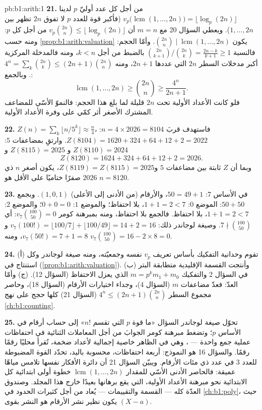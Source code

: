 \begin{solution}{pb:b1:arith:1}
\textbf{21.} من أجل كل عدد أوليّ $p$ لدينا $v_p\bigl(\operatorname{lcm}(1,
\dots, 2n)\bigr) = \lfloor\log_p(2n)\rfloor$ (فأكبر قوة للعدد
$p$ لا تفوق $2n$ تظهر بين $1, \dots, 2n$). ويعطي السؤال 20
مع $m = n$ أن $v_p\binom{2n}n \leq \lfloor\log_p(2n)\rfloor$
من أجل كل $p$: ومنه حسب \cref{prop:b1:arith:valuation} يكون $\binom{2n}n
\mid \operatorname{lcm}(1, \dots, 2n)$. وأمّا الحجم: فالنسبة
$\binom{2n}{k+1}/\binom{2n}k = \frac{2n-k}{k+1} \geq 1$ بالضبط
من أجل $k < n$، ومنه فالمدخلة المركزية أكبر مدخلات
السطر $2n$ التي عددها $2n + 1$، ومنه $4^n = \sum_k \binom{2n}k \leq
(2n+1)\binom{2n}n$. وبالجمع:
\[
\operatorname{lcm}(1, \dots, 2n) \geq \binom{2n}n \geq
\frac{4^n}{2n + 1} .
\]
فلو كانت الأعداد الأولية تحت $2n$ قليلة لما بلغ  هذا
الحجم: فالنموّ الأسّي للمضاعف المشترك الأصغر أثر كمّي على
وفرة الأعداد الأولية.

\textbf{22.} $Z(n) = \sum_k\lfloor n/5^k\rfloor \approx \frac
n4$، فاستهدف قربَ $n = 4 \times 2026 = 8104$: $Z(8104) = 1620 +
324 + 64 + 12 + 2 = 2022$. وارتقِ بمضاعفات $5$: $Z(8110)
= 2024$ و $Z(8115) = 2025$ و
\[
Z(8120) = 1624 + 324 + 64 + 12 + 2 = 2026 .
\]
وبما أن $Z$ ثابتة بين مضاعفات $5$ و$Z(8119) =
Z(8115) = 2025$، يكون أصغر $n$ ذي $2026$ صفرًا ختاميًا على
الأقل هو $n = 8120$.

\textbf{23.} في الأساس $7$: $50 = 49 + 1$، والأرقام (من الأدنى إلى الأعلى) $(1, 0,
1)$. وبجمع $50 + 50$: الموضع $0$: $1 + 1 = 2 < 7$، بلا احتفاظ؛
والموضع $1$: $0 + 0 = 0$؛ والموضع $2$: $1 + 1 = 2 < 7$، بلا
احتفاظ. فالجمع بلا احتفاظ، ومنه بمبرهنة كومر $v_7\binom{100}{50} = 0$: أي $7 \nmid
\binom{100}{50}$. وصيغة لوجاندر  ذلك: $v_7(100!) = \lfloor 100/7
\rfloor + \lfloor 100/49 \rfloor = 14 + 2 = 16$ و$v_7(50!) = 7
+ 1 = 8$، ومنه $v_7\binom{100}{50} = 16 - 2\times8 = 0$.

\textbf{24.} (أ) تقوم وحدانية التفكيك بأساس تعريف
$v_p$ نفسه وجمعيّته، ومنه صيغة لوجاندر
وكل استنتاج في 
(\cref{prop:b1:arith:valuation}). (ب) وأنتجت القسمة الإقليدية
متطابقة البتر في السؤال 2 والتفكيك $m = p^km_1 +
m_0$ الذي يعزل الاحتفاظ (السؤال 12). (ج) وأمّا العدّ: فعدّ
مضاعفات $m$ (السؤال 4)، وجداء اختيارات الأرقام
(السؤال 18)، وحاصر مجموع السطر $4^n \leq
(2n+1)\binom{2n}n$ (السؤال 21) كلها
حجج على نهج \cref{ch:b1:counting}.

\textbf{25.} تحوّل صيغة لوجاندر السؤال «ما قوة $p$ التي تقسم
$n!$» إلى حساب أرقام في الأساس $p$؛ وتضغط مبرهنة كومر
الجوابَ من أجل المعاملات الثنائية في احتفاظات عملية جمع
واحدة --- ، وهي في الظاهر خاصية إجمالية لأعداد
ضخمة، تُقرأ محليًا رقمًا رقمًا. والسؤال 16 هو
النموذج: أربعة احتفاظات، محسوبة باليد، تحدّد القوة المضبوطة
للعدد $3$ في عدد ذي مئات الأرقام. ويبيّن السؤال 21
أن دائرة الأفكار نفسها تلامس مياهًا عميقة: فالحاصر الأدنى
الأسّي للمقدار $\operatorname{lcm}(1, \dots, 2n)$
خطوة أولى ابتدائية كل الابتدائية نحو مبرهنة الأعداد الأولية،
التي يقع برهانها بعيدًا خارج هذا المجلد. وصندوق العدّة كله ---
القسمة  والتقييمات --- يُعاد من أجل كثيرات الحدود في
\cref{ch:b1:poly}، حيث يكون نظير نشر الأرقام هو
النشر بقوى $(X - a)$.
\end{solution}
